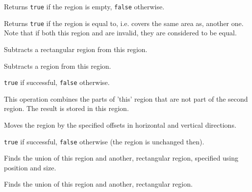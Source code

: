 
Returns {\tt true} if the region is empty, {\tt false} otherwise.


\label{wxregionisequal}


Returns {\tt true} if the region is equal to, i.e. covers the same area as,
another one. Note that if both this region and  are invalid, they
are considered to be equal.


\label{wxregionsubtract}


Subtracts a rectangular region from this region.


Subtracts a region from this region.


{\tt true} if successful, {\tt false} otherwise.


This operation combines the parts of 'this' region that are not part of the second region.
The result is stored in this region.


\label{wxregionoffset}



Moves the region by the specified offsets in horizontal and vertical
directions.


{\tt true} if successful, {\tt false} otherwise (the region is unchanged then).


\label{wxregionunion}


Finds the union of this region and another, rectangular region, specified using position and size.


Finds the union of this region and another, rectangular region.

